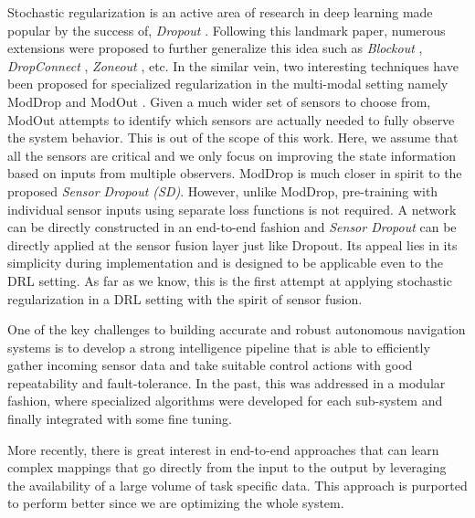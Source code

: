 \documentclass[../thesis.tex]{subfiles}
\begin{document}


Stochastic regularization is an active area of research in deep learning made popular by the success of, \textit{Dropout} \cite{dropout}. Following this landmark paper, numerous extensions were proposed  to further generalize this idea such as \textit{Blockout} \cite{blockout}, \textit{DropConnect} \cite{dropconnect}, \textit{Zoneout} \cite{zoneout}, etc. In the similar vein, two interesting techniques have been proposed for specialized regularization in the multi-modal setting namely ModDrop \cite{moddrop} and ModOut \cite{modout}. 
Given a much wider set of sensors to choose from, ModOut attempts to identify which sensors are actually needed to fully observe the system behavior. This is out of the scope of this work. Here, we assume that all the sensors are critical and we only focus on improving the state information based on inputs from multiple observers. 
ModDrop is much closer in spirit to the proposed \emph{Sensor Dropout (SD)}. However, unlike ModDrop, pre-training with individual sensor inputs using separate loss functions is not required. A network can be directly constructed in an end-to-end fashion and \emph{Sensor Dropout} can be directly applied at the sensor fusion layer just like Dropout. Its appeal lies in its simplicity during implementation and is designed to be applicable even to the DRL setting. As far as we know, this is the first attempt at applying stochastic regularization in a DRL setting with the spirit of sensor fusion. 

One of the key challenges to building accurate and robust autonomous navigation systems is to develop a strong intelligence pipeline that is able to efficiently gather incoming sensor data and take suitable control actions with good repeatability and fault-tolerance. In the past, this was addressed in a modular fashion, where  specialized algorithms were developed for each sub-system and finally integrated with some fine tuning. 

More recently, there is great interest in end-to-end approaches that can learn complex mappings that go directly from the input to the output by leveraging the availability of a large volume of task specific data. This approach is purported to perform better since we are optimizing the whole system. 
\end{document}
